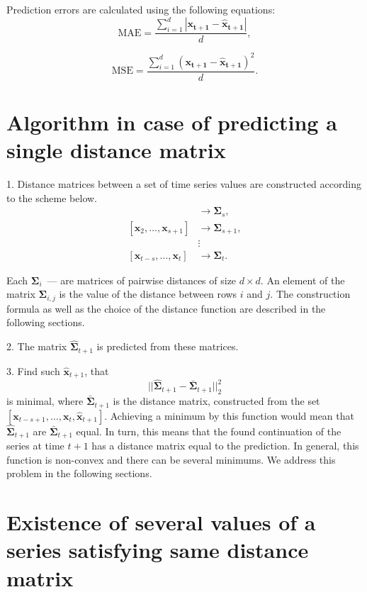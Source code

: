 \documentclass{article}
\begin{document}
Prediction errors are calculated using the following equations:
\[
\text{MAE} = \frac{\sum_{i=1}^{d} |\mathbf{x_{t+1}} - \mathbf{\hat{x}_{t+1}}|}{d},
\]

\[
\text{MSE} = \frac{\sum_{i=1}^{d} (\mathbf{x_{t+1}} - \mathbf{\hat{x}_{t+1}})^2}{d}.
\]

\section{Algorithm in case of predicting a single distance matrix}

1. Distance matrices between a set of time series values are constructed according to the scheme below.
\begin{align*}
	[\mathbf{x}_1, \ldots, \mathbf{x}_s] &\rightarrow \mathbf{\Sigma}_s, \\
	[\mathbf{x}_2, \ldots, \mathbf{x}_{s+1}] &\rightarrow \mathbf{\Sigma}_{s+1}, \\
	&\vdots \\
	[\mathbf{x}_{t-s}, \ldots, \mathbf{x}_t] &\rightarrow \mathbf{\Sigma}_{t}.
\end{align*}

Each $\mathbf{\Sigma}_i$~--- are matrices of pairwise distances of size $d \times d$. An element of the matrix $\mathbf{\Sigma}_{i,j}$ is the value of the distance between rows $i$ and $j$. The construction formula as well as the choice of the distance function are described in the following sections.

2. The matrix $\hat{\mathbf{\Sigma}}_{t+1}$ is predicted from these matrices.

3. Find such $\mathbf{\hat{x}}_{t+1}$, that \[ ||\hat{\mathbf{\Sigma}}_{t+1} - \bar{\mathbf{\Sigma}}_{t+1}||_2^2 \] is minimal, where $\bar{\mathbf{\Sigma}}_{t+1}$ is the distance matrix, constructed from the set $[\mathbf{x}_{t-s+1}, \ldots, \mathbf{x}_{t}, \mathbf{\hat{x}}_{t+1}]$. Achieving a minimum by this function would mean that $\hat{\mathbf{\Sigma}}_{t+1}$ are $\bar{\mathbf{\Sigma}}_{t+1}$ equal. In turn, this means that the found continuation of the series at time $t+1$ has a distance matrix equal to the prediction. In general, this function is non-convex and there can be several minimums. We address this problem in the following sections.

\section{Existence of several values of a series satisfying same distance matrix}
\end{document}
